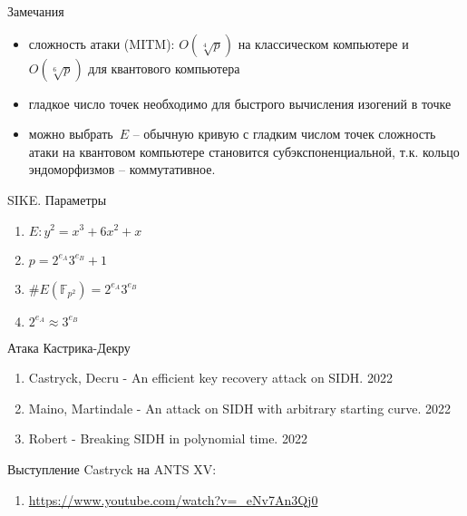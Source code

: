 \documentclass{beamer}
\begin{document}
\begin{frame}{Замечания}
	\begin{itemize}
		\item сложность атаки (MITM): $O(\sqrt[4]{p})$ на классическом компьютере и $O(\sqrt[6]{p})$ для квантового компьютера
		\item гладкое число точек необходимо для быстрого вычисления изогений в точке
		\item можно выбрать~$E$ -- обычную кривую с гладким числом точек \structure{$\implies$} сложность атаки на квантовом компьютере становится субэкспоненциальной, т.к. кольцо эндоморфизмов -- коммутативное.
	\end{itemize}
\end{frame}

\begin{frame}{SIKE. Параметры}
\begin{enumerate}
	\item $E: y^2 = x^3 + 6 x^2 + x$
	\item $p = 2^{e_A} 3^{e_B} + 1$
	\item $\#E(\mathbb{F}_{p^2}) = 2^{e_A} 3^{e_B}$
	\item $2^{e_A} \approx 3^{e_B}$
\end{enumerate}
\end{frame}

\begin{frame}{Атака Кастрика-Декру}
	\begin{enumerate}
		\item[\structure{{\faScroll}}] Castryck, Decru - An efficient key recovery attack on SIDH. 2022
		\vspace{0.5em}
		\item[\structure{{\faScroll}}] Maino, Martindale - An attack on SIDH with arbitrary starting curve. 2022
		\vspace{0.5em}
		
		\item[\structure{{\faScroll}}] Robert - Breaking SIDH in polynomial time. 2022
	\end{enumerate}

\vspace*{1em}

Выступление Castryck на ANTS XV:

\begin{enumerate}
	\item [\structure{{\faYoutube}}] \url{https://www.youtube.com/watch?v=_eNv7An3Qj0}
\end{enumerate}
\end{frame}
\end{document}
